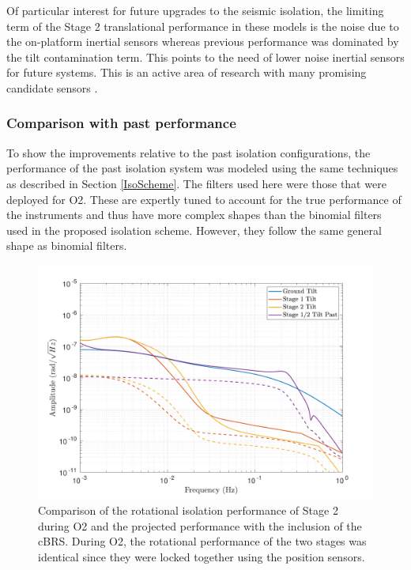 \documentclass [12pt, proquest]{uwthesis}[2019]
\begin{document}
Of particular interest for future upgrades to the seismic isolation, the limiting term of the Stage 2 translational performance in these models is the noise due to the on-platform inertial sensors whereas previous performance was dominated by the tilt contamination term. \cite{windproofing} This points to the need of lower noise inertial sensors for future systems. This is an active area of research with many promising candidate sensors \cite{Mow_Lowry_2019, Cooper_2018}. 

\subsubsection{Comparison with past performance}

To show the improvements relative to the past isolation configurations, the performance of the past isolation system was modeled using the same techniques as described in Section \ref{IsoScheme}. The filters used here were those that were deployed for O2. These are expertly tuned to account for the true performance of the instruments and thus have more complex shapes than the binomial filters used in the proposed isolation scheme. However, they follow the same general shape as binomial filters.

\begin{figure}[!h]
\begin{center}
\includegraphics[width=\textwidth]{cBRS_Model_CompRX.pdf}
\caption[Comparison of the rotational isolation performance of Stage 2 during O2 and the projected performance with the inclusion of the cBRS]{Comparison of the rotational isolation performance of Stage 2 during O2 and the projected performance with the inclusion of the cBRS. During O2, the rotational performance of the two stages was identical since they were locked together using the position sensors.}
\label{cBRSCompR}
\end{center}
\end{figure}
\end{document}
